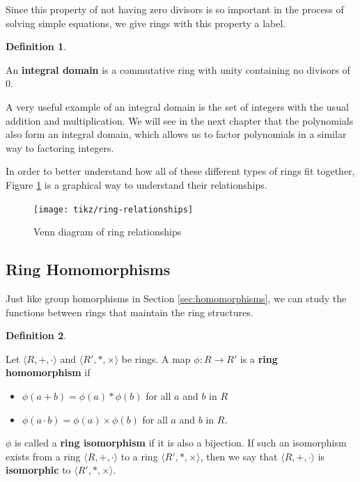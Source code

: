 \documentclass[
]{book}
\providecommand{\tightlist}{%
  \setlength{\itemsep}{0pt}\setlength{\parskip}{0pt}}
\theoremstyle{definition}
\newtheorem{definition}{Definition}[chapter]
\theoremstyle{definition}
\theoremstyle{definition}
\theoremstyle{definition}
\theoremstyle{remark}
\begin{document}
Since this property of not having zero divisors is so important in the process of solving simple equations, we give rings with this property a label.

\begin{definition}
\protect\hypertarget{def:unlabeled-div-101}{}\label{def:unlabeled-div-101}

An \textbf{integral domain} is a commutative ring with unity containing no divisors of \(0\).

\end{definition}

A very useful example of an integral domain is the set of integers with the usual addition and multiplication. We will see in the next chapter that the polynomials also form an integral domain, which allows us to factor polynomials in a similar way to factoring integers.

In order to better understand how all of these different types of rings fit together, Figure \ref{fig:venn-rings} is a graphical way to understand their relationships.

\begin{figure}

{\centering \texttt{[image: tikz/ring-relationships]} 

}

\caption{Venn diagram of ring relationships}\label{fig:venn-rings}
\end{figure}

\hypertarget{ring-homomorphisms}{%
\subsection{Ring Homomorphisms}\label{ring-homomorphisms}}

Just like group homorphisms in Section \ref{sec:homomorphisms}, we can study the functions between rings that maintain the ring structures.

\begin{definition}
\protect\hypertarget{def:unlabeled-div-102}{}\label{def:unlabeled-div-102}

Let \(\langle R,+,\cdot\rangle\) and \(\langle R',\ast,\times\rangle\) be rings. A map \(\phi:R\rightarrow R'\) is a \textbf{ring homomorphism} if

\begin{itemize}
\tightlist
\item
  \(\phi(a+b)=\phi(a) \ast \phi(b)\) for all \(a\) and \(b\) in \(R\)
\item
  \(\phi(a\cdot b)=\phi(a)\times \phi(b)\) for all \(a\) and \(b\) in \(R\).
\end{itemize}

\(\phi\) is called a \textbf{ring isomorphism} if it is also a bijection. If such an isomorphism exists from a ring \(\langle R,+,\cdot\rangle\) to a ring \(\langle R',\ast,\times\rangle\), then we say that \(\langle R,+,\cdot\rangle\) is \textbf{isomorphic} to \(\langle R',\ast,\times\rangle\).

\end{definition}
\end{document}
